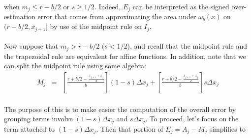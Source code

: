 \documentclass{article}
\begin{document}
\noindent
when $m_j \leq r - b/2$ or $s \geq 1/2$. Indeed, $E_j$ can be interpreted as the signed over-estimation error that comes from approximating the area under $\omega_b(x)$ on $(r - b/2, x_{j+1}]$ by use of the midpoint rule on $I_j$.
\\
\\
Now suppose that $m_j > r - b/2$ ($s < 1/2$), and recall that the midpoint rule and the trapezoidal rule are equivalent for affine functions. In addition, note that we can split the midpoint rule using some algebra:
\[
    \begin{array}{rcl}
        M_j &=& \displaystyle
                \left[
                    \frac{r + b/2 -
                        \frac{x_{j+1}+x_j}{2}
                    }{b}
                \right]
                (1 - s)\Delta x_j
                +
                \left[
                    \frac{r + b/2 -
                        \frac{x_{j+1}+x_j}{2}
                    }{b}
                \right]
                s\Delta x_j \\
    \end{array}
\]

\noindent
The purpose of this is to make easier the computation of the overall error by grouping terms involve $(1 - s) \Delta x_j$ and $s\Delta x_j$. To proceed, let's focus on the term attached to $(1 - s)\Delta x_j$. Then that portion of $E_j = A_j - M_j$ simplifies to 
\end{document}
